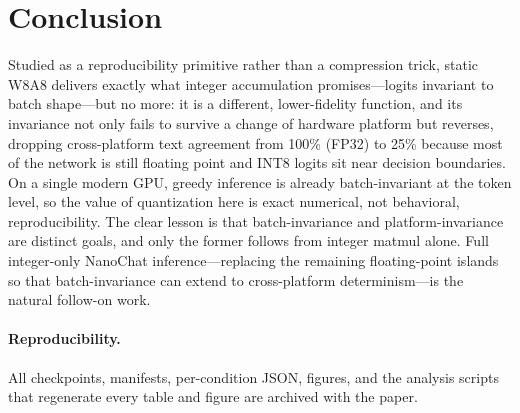 \documentclass[10pt,twocolumn]{article}
\begin{document}
\section{Conclusion}
Studied as a reproducibility primitive rather than a compression trick, static
W8A8 delivers exactly what integer accumulation promises---logits invariant to
batch shape---but no more: it is a different, lower-fidelity function, and its
invariance not only fails to survive a change of hardware platform but reverses,
dropping cross-platform text agreement from 100\% (FP32) to 25\% because most of
the network is still floating point and INT8 logits sit near decision boundaries.
On a single modern GPU, greedy inference is already batch-invariant at the token
level, so the value of quantization here is exact numerical, not behavioral,
reproducibility. The clear lesson is that batch-invariance and platform-invariance
are distinct goals, and only the former follows from integer matmul alone.
Full integer-only NanoChat inference---replacing the remaining floating-point
islands so that batch-invariance can extend to cross-platform determinism---is the
natural follow-on work.

{\footnotesize
\paragraph{Reproducibility.} All checkpoints, manifests, per-condition JSON,
figures, and the analysis scripts that regenerate every table and figure are
archived with the paper.}



\end{document}
